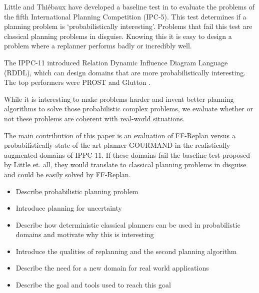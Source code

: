\documentclass[runningheads,a4paper]{llncs}
\begin{document}
Little and Thi\'ebaux have developed a baseline test in
\cite{little2007probvsreplan} to evaluate the problems of the fifth International
Planning Competition (IPC-5). This test determines if a planning problem is
`probabilistically interesting'. Problems that fail this test are classical
planning problems in disguise. Knowing this it is easy to design a problem
where a replanner performs badly or incredibly well.

The IPPC-11 introduced Relation Dynamic Influence Diagram Language (RDDL),
which can design domains that are more probabilistically interesting. The top
performers were PROST \cite{keller2012prost} and Glutton
\cite{kolobov2012glutton}.

While it is interesting to make problems harder and invent better planning
algorithms to solve those probabilistic complex problems, we evaluate whether
or not these problems are coherent with real-world situations.

The main contribution of this paper is an evaluation of FF-Replan versus a
probabilistically state of the art planner GOURMAND in the realistically
augmented domains of IPPC-11. If these domains fail the baseline test proposed
by Little et\@. all, they would translate to classical planning problems in
disguise and could be easily solved by FF-Replan.

\begin{itemize}
	\item Describe probabilistic planning problem
	\item Introduce planning for uncertainty
	\item Describe how deterministic classical planners can be used in probabilistic domains and motivate why this is interesting
	\item Introduce the qualities of replanning and the second planning algorithm
	\item Describe the need for a new domain for real world applications
	\item Describe the goal and tools used to reach this goal
\end{itemize}

\end{document}
